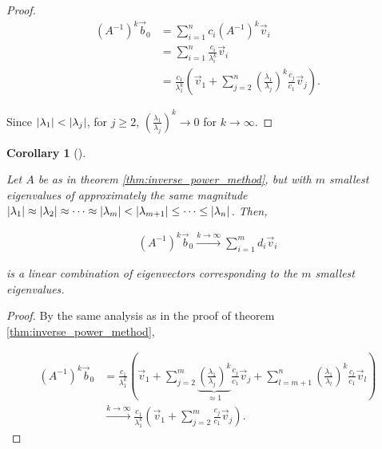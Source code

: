 \documentclass{article}
\theoremstyle{plain} %
\newtheorem{corollary}[theorem]{Corollary}
\theoremstyle{convention} %
\theoremstyle{remark} %
\numberwithin{equation}{section}
\begin{document}
\begin{appendix}
\begin{proof}

\begin{align*}
  (A^{-1})^k \vec{b}_0 &= \sum_{i=1}^n c_i (A^{-1})^k \vec{v}_i\\
  &= \sum_{i=1}^n \frac{c_i}{\lambda_i^{k}} \vec{v}_i\\
  &= \frac{c_1}{\lambda_1^k} \left( \vec{v}_1 + \sum_{j=2}^n \left(\frac{\lambda_1}{\lambda_j}\right)^k \frac{c_j}{c_1} \vec{v}_j \right).
\end{align*}

Since $\abs{\lambda_1} < \abs{\lambda_j}$, for $j \ge 2$, $\left(\frac{\lambda_1}{\lambda_j}\right)^k \to 0$ for $k \to \infty$.

\end{proof}

\begin{corollary}[]

\label{cor:inverse_power_method}

Let $A$ be as in theorem \ref{thm:inverse_power_method}, but with $m$ smallest eigenvalues of approximately the same magnitude $\abs{\lambda_1} \approx \abs{\lambda_2} \approx \dots \approx \abs{\lambda_{m}} < \abs{\lambda_{m+1}} \leq \dots \leq \abs{\lambda_n}$. Then,

\begin{align*}
  (A^{-1})^k \vec{b}_0 \xrightarrow{k\rightarrow\infty} \sum_{i=1}^m d_i \vec{v}_i
\end{align*}

is a linear combination of eigenvectors corresponding to the $m$ smallest eigenvalues.

\end{corollary}

\begin{proof}

By the same analysis as in the proof of theorem \ref{thm:inverse_power_method},

\begin{align*}
  (A^{-1})^k \vec{b}_0 &= \frac{c_1}{\lambda_1^k} \left( \vec{v}_1 + \sum_{j=2}^m \underbrace{\left(\frac{\lambda_1}{\lambda_j}\right)^k}_{\approx 1} \frac{c_j}{c_1} \vec{v}_j + \sum_{l=m+1}^n \left(\frac{\lambda_1}{\lambda_l}\right)^k \frac{c_l}{c_1} \vec{v}_l \right) \\
  &\xrightarrow{k\rightarrow\infty} \frac{c_1}{\lambda_1^k} \left( \vec{v}_1 + \sum_{j=2}^m \frac{c_j}{c_1} \vec{v}_j \right).
\end{align*}

\end{proof}


\end{appendix}
\end{document}
